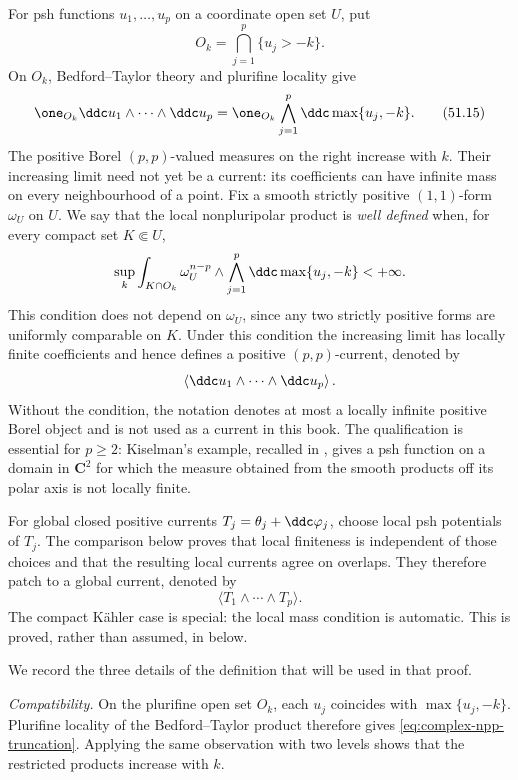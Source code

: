 For psh functions \(u_1,\ldots,u_p\) on a coordinate open set \(U\), put
\[
 O_k=\bigcap_{j=1}^p\{u_j>-k\}.
\]
On \(O_k\), Bedford--Taylor theory and plurifine locality give
\[
 \one_{O_k}\ddc u_1\wedge\cdots\wedge\ddc u_p
 =
 \one_{O_k}\bigwedge_{j=1}^p\ddc\max\{u_j,-k\}.
\tag{51.15}\label{eq:complex-npp-truncation}
\]
The positive Borel \((p,p)\)-valued measures on the right increase with
\(k\).  Their increasing limit need not yet be a current: its coefficients
can have infinite mass on every neighbourhood of a point.  Fix a smooth
strictly positive \((1,1)\)-form \(\omega_U\) on \(U\).  We say that the
local nonpluripolar product is \emph{well defined} when, for every compact
set \(K\Subset U\),
\[
 \sup_k\int_{K\cap O_k}\omega_U^{n-p}\wedge
       \bigwedge_{j=1}^p\ddc\max\{u_j,-k\}<+\infty.
\]
This condition does not depend on \(\omega_U\), since any two strictly
positive forms are uniformly comparable on \(K\).  Under this condition the
increasing limit has locally finite coefficients and hence defines a positive
\((p,p)\)-current, denoted by
\[
              \left\langle\ddc u_1\wedge\cdots\wedge\ddc u_p\right\rangle .
\]
Without the condition, the notation denotes at most a locally infinite
positive Borel object and is not used as a current in this book.  The
qualification is essential for \(p\geq2\): Kiselman's example, recalled in
\cite[Example~1.3]{BEGZ10}, gives a psh function on a domain in
\(\mathbf C^2\) for which the measure obtained from the smooth products off
its polar axis is not locally finite.

For global closed positive currents
\(T_j=\theta_j+\ddc\varphi_j\), choose local psh potentials of \(T_j\).
The comparison below proves that local finiteness is independent of those
choices and that the resulting local currents agree on overlaps.  They
therefore patch to a global current, denoted by
\[
       \langle T_1\wedge\cdots\wedge T_p\rangle .
\tag{51.16}\label{eq:complex-global-npp}
\]
The compact K\"ahler case is special: the local mass condition is automatic.
This is proved, rather than assumed, in
 below.

We record the three details of the definition that will be used in that
proof.

\emph{Compatibility.}  On the plurifine open set \(O_k\), each \(u_j\)
coincides with \(\max\{u_j,-k\}\).  Plurifine locality of the
Bedford--Taylor product therefore gives
\eqref{eq:complex-npp-truncation}.  Applying the same observation with two
levels shows that the restricted products increase with \(k\).

